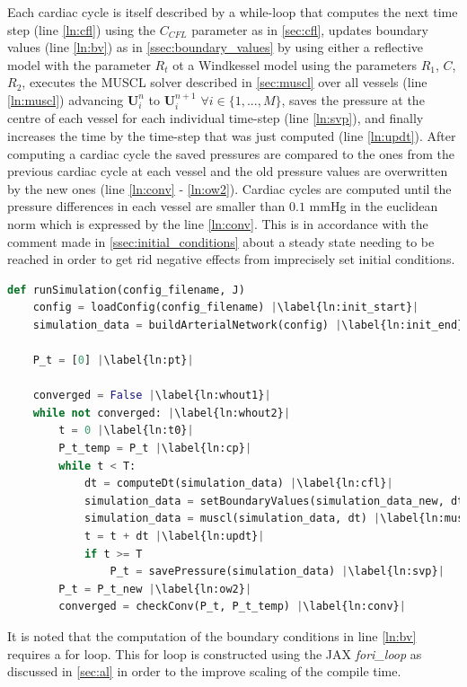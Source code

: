 \documentclass[a4paper, oneside]{discothesis}
\begin{document}
							Each cardiac cycle is itself described by a while-loop that computes the next time step (line \ref{ln:cfl}) using the $C_{CFL}$ parameter as in \autoref{sec:cfl}, updates boundary values (line \ref{ln:bv}) as in \autoref{ssec:boundary_values} by using either a reflective model with the parameter $R_t$ ot a Windkessel model using the parameters $R_1$, $C$, $R_2$, executes the MUSCL solver described in \autoref{sec:muscl} over all vessels (line \ref{ln:muscl}) advancing $\mathbf{U}_i^{n}$ to $\mathbf{U}_i^{n+1}$ $\forall i \in \{1,...,M\}$, saves the pressure at the centre of each vessel for each individual time-step (line \ref{ln:svp}), and finally increases the time by the time-step that was just computed (line \ref{ln:updt}).
							After computing a cardiac cycle the saved pressures are compared to the ones from the previous cardiac cycle at each vessel and the old pressure values are overwritten by the new ones (line \ref{ln:conv} - \ref{ln:ow2}).
							Cardiac cycles are computed until the pressure differences in each vessel are smaller than $0.1$ mmHg in the euclidean norm which is expressed by the line \ref{ln:conv}.
							This is in accordance with the comment made in \autoref{ssec:initial_conditions} about a steady state needing to be reached in order to get rid negative effects from imprecisely set initial conditions.
\begin{lstlisting}[language=Python, caption=code structure in pseudocode, label=lst:pc, escapechar=|]
def runSimulation(config_filename, J)
	config = loadConfig(config_filename) |\label{ln:init_start}|
	simulation_data = buildArterialNetwork(config) |\label{ln:init_end}|

	P_t = [0] |\label{ln:pt}|

	converged = False |\label{ln:whout1}|
	while not converged: |\label{ln:whout2}|
		t = 0 |\label{ln:t0}|
		P_t_temp = P_t |\label{ln:cp}|
		while t < T:
			dt = computeDt(simulation_data) |\label{ln:cfl}|
			simulation_data = setBoundaryValues(simulation_data_new, dt) |\label{ln:bv}|
			simulation_data = muscl(simulation_data, dt) |\label{ln:muscl}|
			t = t + dt |\label{ln:updt}|
			if t >= T
				P_t = savePressure(simulation_data) |\label{ln:svp}|
		P_t = P_t_new |\label{ln:ow2}|
		converged = checkConv(P_t, P_t_temp) |\label{ln:conv}|
						\end{lstlisting}
						It is noted that the computation of the boundary conditions in line \ref{ln:bv} requires a for loop.
						This for loop is constructed using the JAX \emph{fori\_loop} as discussed in \autoref{sec:al} in order to the improve scaling of the compile time.
\end{document}
